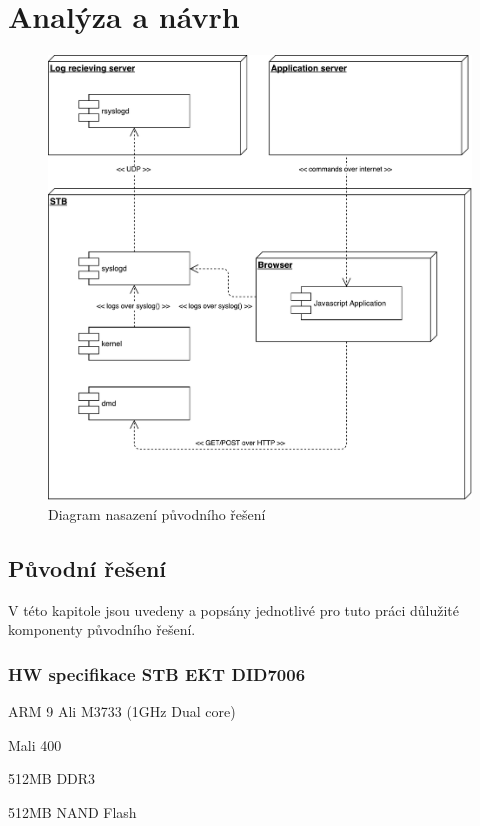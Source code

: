 \documentclass[thesis=B,czech]{FITthesis}[2012/06/26]
\begin{document}
\chapter{Analýza a návrh}
\begin{figure}[H]
	\centering
	\includegraphics[scale=0.5]{images/diagram-nasazeni-puvodniho-reseni}
	\caption[Diagram nasazení původního řešení]{Diagram nasazení původního řešení}
\end{figure}

\section{Původní řešení}
V této kapitole jsou uvedeny a popsány jednotlivé pro tuto práci důlužité komponenty původního řešení.

\subsection{HW specifikace STB EKT DID7006}
\begin{description}
\setlength\itemsep{-1ex}
  \item [CPU:] ARM 9 Ali M3733 (1GHz Dual core)
  \item [GPU:] Mali 400
  \item [RAM:] 512MB DDR3
  \item [Perzistentní paměť:] 512MB NAND Flash
\end{description}
\end{document}
